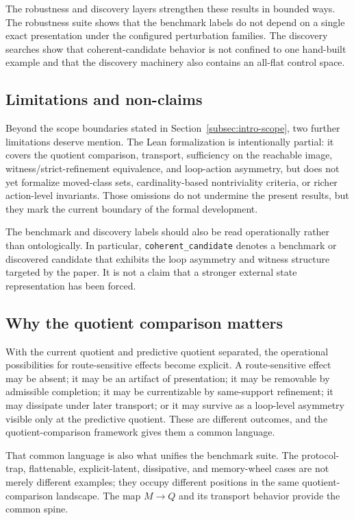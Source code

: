 \documentclass[11pt]{article}
\newcommand{\CurrentQ}{Q}
\newcommand{\PredictiveQ}{M}
\theoremstyle{definition}
\begin{document}
The robustness and discovery layers strengthen these results in bounded ways. The robustness suite shows that the benchmark labels do not depend on a single exact presentation under the configured perturbation families. The discovery searches show that coherent-candidate behavior is not confined to one hand-built example and that the discovery machinery also contains an all-flat control space.

\subsection{Limitations and non-claims}\label{subsec:discussion-limitations}
Beyond the scope boundaries stated in Section~\ref{subsec:intro-scope}, two further limitations deserve mention. The Lean formalization is intentionally partial: it covers the quotient comparison, transport, sufficiency on the reachable image, witness/strict-refinement equivalence, and loop-action asymmetry, but does not yet formalize moved-class sets, cardinality-based nontriviality criteria, or richer action-level invariants. Those omissions do not undermine the present results, but they mark the current boundary of the formal development.

The benchmark and discovery labels should also be read operationally rather than ontologically. In particular, \texttt{coherent\_candidate} denotes a benchmark or discovered candidate that exhibits the loop asymmetry and witness structure targeted by the paper. It is not a claim that a stronger external state representation has been forced.

\subsection{Why the quotient comparison matters}\label{subsec:discussion-why}
With the current quotient and predictive quotient separated, the operational possibilities for route-sensitive effects become explicit. A route-sensitive effect may be absent; it may be an artifact of presentation; it may be removable by admissible completion; it may be currentizable by same-support refinement; it may dissipate under later transport; or it may survive as a loop-level asymmetry visible only at the predictive quotient. These are different outcomes, and the quotient-comparison framework gives them a common language.

That common language is also what unifies the benchmark suite. The protocol-trap, flattenable, explicit-latent, dissipative, and memory-wheel cases are not merely different examples; they occupy different positions in the same quotient-comparison landscape. The map $\PredictiveQ \to \CurrentQ$ and its transport behavior provide the common spine.
\end{document}
